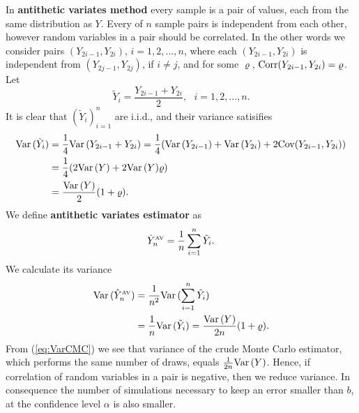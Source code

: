 \documentclass[a4paper,12pt, oneside]{book}
\theoremstyle{definition}
\theoremstyle{remark}
\def\Var{{\rm Var}\,}
\def\Cov{{\hbox{Cov}}}
\def\Corr{{\hbox{Corr}}}
\def\AV[#1]{\hat{Y}^{\hbox{\tiny AV}}_{#1}}
\begin{document}
In \textbf{antithetic variates method} every sample is a pair of values, each from the same distribution as $Y$. Every of $n$ sample pairs is independent from each other, however random variables in a pair should be correlated. In the other words we consider pairs $(Y_{2i-1}, Y_{2i})$, $i=1,2,...,n$, where each $(Y_{2i-1}, Y_{2i})$ is independent from $(Y_{2j-1}, Y_{2j})$, if $i \neq j$, and for some $\varrho$, $\Corr(Y_{2i-1}, Y_{2i}) = \varrho$. Let
\begin{equation*}
 \tilde{Y}_i = \frac{Y_{2i-1} + Y_{2i}}{2},\ \ \ i = 1,2,...,n.
\end{equation*}
It is clear that $(\tilde{Y}_i)_{i=1}^n$ are i.i.d., and their variance satisifies
\begin{equation*}
 \begin{split}
 \Var(\tilde{Y}_i) &= \dfrac{1}{4} \Var( Y_{2i-1} + Y_{2i} ) = \dfrac{1}{4} (\Var(Y_{2i-1}) + \Var(Y_{2i}) + 2\Cov(Y_{2i-1}, Y_{2i})) \\
 &= \dfrac{1}{4} (2\Var(Y) + 2\Var(Y)\varrho) \\
 &= \dfrac{\Var(Y)}{2} (1 + \varrho).
 \end{split}
\end{equation*}
We define \textbf{antithetic variates estimator} as
\begin{equation*}
 \AV[n] = \frac{1}{n}\sum\limits_{i=1}^n \tilde{Y}_i.
\end{equation*}
We calculate its variance
\begin{equation}
 \label{eq:VarAV}
 \begin{split}
 \Var(\AV[n]) &= \frac{1}{n^2} \Var(\sum\limits_{i=1}^n \tilde{Y}_i) \\
   &= \frac{1}{n} \Var(\tilde{Y}_i) = \dfrac{\Var(Y)}{2n} (1 + \varrho).
 \end{split}
\end{equation}
From (\ref{eq:VarCMC}) we see that variance of the crude Monte Carlo estimator, which performs the same number of draws, equals $\frac{1}{2n}\Var(Y)$. Hence, if correlation of random variables in a pair is negative, then we reduce variance. In consequence the number of simulations necessary to keep an error smaller than $b$, at the confidence level $\alpha$ is also smaller.
\end{document}
